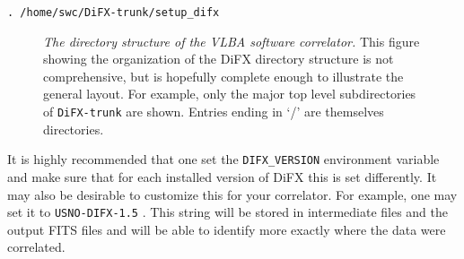 {\tt . /home/swc/DiFX-trunk/setup\_difx}

\begin{figure}[h]
\begin{center}
\caption[dirtree]{
{\em The directory structure of the VLBA software correlator.}  
This figure showing the organization of the DiFX directory structure is not comprehensive, but is hopefully complete enough to illustrate the general layout.
For example, only the major top level subdirectories of {\tt DiFX-trunk} are shown.
Entries ending in `/' are themselves directories.
\label{fig:dirtree}
}
\end{center}
\end{figure}

It is highly recommended that one set the {\tt DIFX\_VERSION} environment variable and make sure that for each installed version of DiFX this is set differently.
It may also be desirable to customize this for your correlator.
For example, one may set it to {\tt USNO-DIFX-1.5} .
This string will be stored in intermediate files and the output FITS files and will be able to identify more exactly where the data were correlated.
